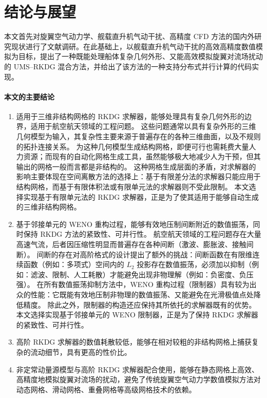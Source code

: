 
\chapter*{结论与展望}


本文首先对旋翼空气动力学、舰载直升机气动干扰、高精度 CFD 方法的国内外研究现状进行了文献调研。在此基础上，以舰载直升机气动干扰的高效高精度数值模拟为目标，提出了一种既能处理船体复杂几何外形、又能高效模拟旋翼对流场扰动的
UMS–RKDG 混合方法，并给出了该方法的一种支持分布式并行计算的代码实现。

\subsubsection*{本文的主要结论}
\begin{enumerate}[wide]
\item 适用于三维非结构网格的 RKDG 求解器，能够处理具有复杂几何外形的边界，适用于航空航天领域的工程问题。
这些问题通常以具有复杂外形的三维几何模型为输入，其复杂性主要来源于普遍存在的各种三维曲面，以及不规则的拓扑连接关系。
为这种几何模型生成结构网格，即便可行也需耗费大量人力资源；而现有的自动化网格生成工具，虽然能够极大地减少人为干预，但其输出的网格一般而言都是非结构的。
这种网格生成层面的矛盾，对求解器的影响主要体现在空间离散方法的选择上：基于有限差分法的求解器只能应用于结构网格，而基于有限体积法或有限单元法的求解器则不受此限制。
本文选择实现基于有限单元法的 RKDG 求解器，正是为了使其适用于能够自动生成的三维非结构网格。

\item 基于邻接单元的 WENO 重构过程，能够有效地压制间断附近的数值振荡，同时保持 RKDG 方法的紧致性、可并行性。
航空航天领域的工程问题存在大量高速气流，后者因压缩性明显而普遍存在各种间断（激波、膨胀波、接触间断）。
间断的存在对高阶格式的设计提出了额外的挑战：间断函数在有限维连续函数（例如：多项式）空间内的 $L_2$ 投影存在数值振荡，必须加以抑制（例如：滤波、限制、人工耗散）才能避免出现非物理解（例如：负密度、负压强）。
在所有数值振荡抑制方法中，WENO 重构过程（限制器）具有较为出众的性能：它既能有效地压制非物理的数值振荡、又能避免在光滑极值点处降低精度。
除此之外，限制器的构造还应保持其所依托的求解器既有的优势。本文选择实现基于邻接单元的 WENO 限制器，正是为了保持 RKDG 求解器的紧致性、可并行性。

\item 高阶 RKDG 求解器的数值耗散较低，能够在相对较粗的非结构网格上捕获复杂的流动细节，具有更高的性价比。 
\item 非定常动量源模型与高阶 RKDG 求解器配合使用，能够在静态网格上高效、高精度地模拟旋翼对流场的扰动，避免了传统旋翼空气动力学数值模拟方法对动态网格、滑动网格、重叠网格等高级网格技术的依赖。
\end{enumerate}



